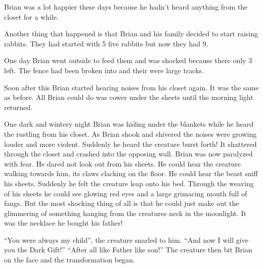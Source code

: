 Brian was a lot happier these days because he hadn't heard anything
from the closet for a while.



Another thing that happened is that Brian and his family decided to
start raising rabbits. They had started with 5 five rabbits but now
they had 9.



One day Brian went outside to feed them and was shocked because
there only 3 left. The fence had been broken into and their were
large tracks.



Soon after this Brian started hearing noises from his closet again.
It was the same as before. All Brian could do was cower under the
sheets until the morning light returned.



One dark and wintery night Brian was hiding under the blankets
while he heard the rustling from his closet. As Brian shook and
shivered the noises were growing louder and more violent. Suddenly
he heard the creature burst forth! It shattered through the closet
and crashed into the opposing wall. Brian was now paralyzed with
fear. He dared not look out from his sheets. He could hear the
creature walking towards him, its claws clacking on the floor. He
could hear the beast sniff his sheets. Suddenly he felt the
creature leap onto his bed. Through the weaving of his sheets he
could see glowing red eyes and a large grimacing mouth full of
fangs. But the most shocking thing of all is that he could just
make out the glimmering of something hanging from the creatures
neck in the moonlight. It was the necklace he bought his
father!



``You were always my child'', the creature snarled to him. ``And now I
will give you the Dark Gift!'' ``After all like Father like son!'' The
creature then bit Brian on the face and the transformation began. 

 



